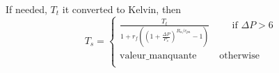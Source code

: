 If needed, $T_t$ it converted to Kelvin, then
\[
T_s =
\begin{cases}
\frac{T_t}
     {1 + r_f \left( \left(1 + \frac{\Delta P}{P_s}\right)
        ^{R_a/c_{pa}} - 1\right)} \qquad \text{ if } \Delta P > 6 \\
\text{valeur\_manquante} \qquad \text{ otherwise } \\
\end{cases}
\]
